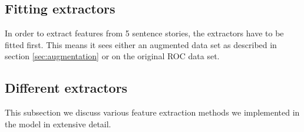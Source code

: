 \documentclass{article}
\begin{document}
\pagebreak
\subsection{Fitting extractors}
In order to extract features from 5 sentence stories, the extractors have to be fitted first. This means it sees either an augmented data set as described in section \ref{sec:augmentation} or on the original ROC data set.

\subsection{Different extractors}
\label{sec:extractors}
This subsection we discuss various feature extraction methods we implemented in the model in extensive detail.\\
\end{document}
